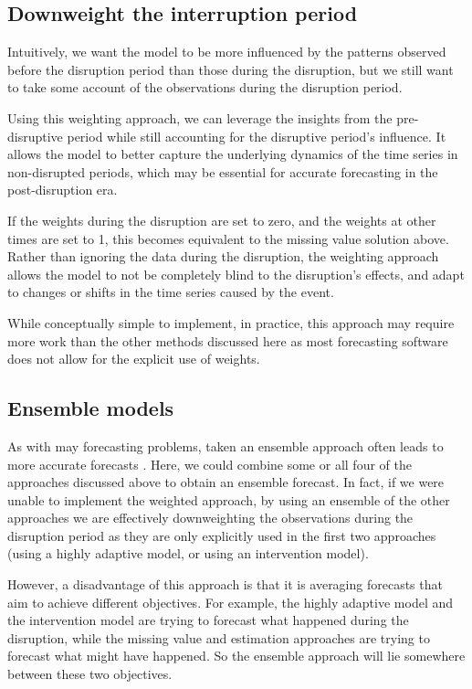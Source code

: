 \documentclass[11pt,a4paper,]{article}
\begin{document}
\subsection{Downweight the interruption
period}\label{downweight-the-interruption-period}

Intuitively, we want the model to be more influenced by the patterns
observed before the disruption period than those during the disruption,
but we still want to take some account of the observations during the
disruption period.

Using this weighting approach, we can leverage the insights from the
pre-disruptive period while still accounting for the disruptive period's
influence. It allows the model to better capture the underlying dynamics
of the time series in non-disrupted periods, which may be essential for
accurate forecasting in the post-disruption era.

If the weights during the disruption are set to zero, and the weights at
other times are set to 1, this becomes equivalent to the missing value
solution above. Rather than ignoring the data during the disruption, the
weighting approach allows the model to not be completely blind to the
disruption's effects, and adapt to changes or shifts in the time series
caused by the event.

While conceptually simple to implement, in practice, this approach may
require more work than the other methods discussed here as most
forecasting software does not allow for the explicit use of weights.

\subsection{Ensemble models}\label{ensemble-models}

As with may forecasting problems, taken an ensemble approach often leads
to more accurate forecasts \autocite{combinations}. Here, we could
combine some or all four of the approaches discussed above to obtain an
ensemble forecast. In fact, if we were unable to implement the weighted
approach, by using an ensemble of the other approaches we are
effectively downweighting the observations during the disruption period
as they are only explicitly used in the first two approaches (using a
highly adaptive model, or using an intervention model).

However, a disadvantage of this approach is that it is averaging
forecasts that aim to achieve different objectives. For example, the
highly adaptive model and the intervention model are trying to forecast
what happened during the disruption, while the missing value and
estimation approaches are trying to forecast what might have happened.
So the ensemble approach will lie somewhere between these two
objectives.
\end{document}

